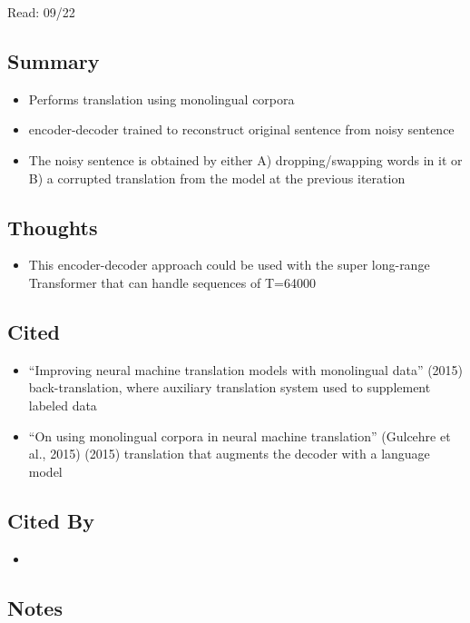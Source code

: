 \documentclass{article}
\begin{document}
\noindent Read: 09/22

\subsection*{Summary}
\begin{itemize}
	\item Performs translation using monolingual corpora
	\item encoder-decoder trained to reconstruct original sentence from noisy sentence
	\item The noisy sentence is obtained by either A) dropping/swapping words in it or B) a corrupted translation from the model at the previous iteration
\end{itemize}

\subsection*{Thoughts}
\begin{itemize}
	\item This encoder-decoder approach could be used with the super long-range Transformer that can handle sequences of T=64000
\end{itemize}

\subsection*{Cited}
\begin{itemize}
	\item ``Improving neural machine translation models with monolingual data'' (2015) back-translation, where auxiliary translation system used to supplement labeled data
	\item ``On using monolingual corpora in neural machine translation'' (Gulcehre et al., 2015) (2015) translation that augments the decoder with a language model
\end{itemize}

\subsection*{Cited By}
\begin{itemize}
	\item
\end{itemize}

\subsection*{Notes}
\end{document}
